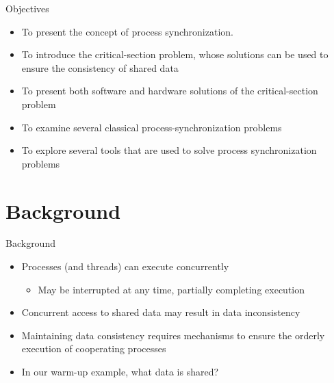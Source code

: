 \documentclass[10pt]{beamer}
\begin{document}
\begin{frame}{Objectives}
\begin{itemize}
\item To present the concept of process synchronization.
\item To introduce the critical-section problem, whose solutions can be used to ensure the consistency of shared data
\item To present both software and hardware solutions of the critical-section problem
\item To examine several classical process-synchronization problems
\item To explore several tools that are used to solve process synchronization problems
\end{itemize}
\end{frame}



\section[1.Background]{Background}
\begin{frame}{Background}
\begin{itemize}
\item Processes (and threads) can execute concurrently
\begin{itemize}
\item May be interrupted at any time, partially completing execution
\end{itemize}
\item Concurrent access to shared data may result in data inconsistency
\item Maintaining data consistency requires mechanisms to ensure the orderly execution of cooperating processes
\item In our warm-up example, what data is shared?
\end{itemize}
\end{frame}
\end{document}
